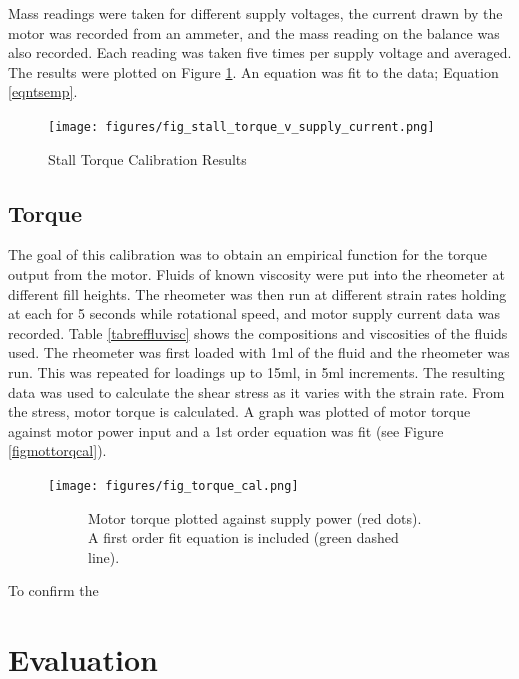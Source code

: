 \documentclass[twoside,a4]{report}
\def\br{\newline \newline \noindent}
\begin{document}
	\noindent
	Mass readings were taken for different supply voltages, the current drawn by the motor was recorded from an ammeter, and the mass reading on the balance was also recorded. Each reading was taken five times per supply voltage and averaged. The results were plotted on Figure \ref{figstalltcal}. An equation was fit to the data; Equation \ref{eqntsemp}.
	
	\begin{figure}[!htb]
		\centering
		\texttt{[image: figures/fig\_stall\_torque\_v\_supply\_current.png]}
		\caption{Stall Torque Calibration Results}
		\label{figstalltcal}
	\end{figure}
	
	\subsection*{Torque}
	The goal of this calibration was to obtain an empirical function for the torque output from the motor. Fluids of known viscosity were put into the rheometer at different fill heights. The rheometer was then run at different strain rates holding at each for 5 seconds while rotational speed, and motor supply current data was recorded.\br
	Table \ref{tabreffluvisc} shows the compositions and viscosities of the fluids used. The rheometer was first loaded with 1ml of the fluid and the rheometer was run. This was repeated for loadings up to 15ml, in 5ml increments. The resulting data was used to calculate the shear stress as it varies with the strain rate. From the stress, motor torque is calculated. A graph was plotted of motor torque against motor power input and a 1st order equation was fit (see Figure \ref{figmottorqcal}).


	\begin{figure}[!htb]
		\centering
		\texttt{[image: figures/fig\_torque\_cal.png]}
		\caption{Torque Calibration Results}
		\label{figmottorqcal}
		\begin{subfigure}{0.9\textwidth}
			\footnotesize Motor torque plotted against supply power (red dots). A first order fit equation is included (green dashed line).
		\end{subfigure}
	\end{figure}
	
	\noindent
	To confirm the 

	\section{Evaluation}
	
\end{document}
